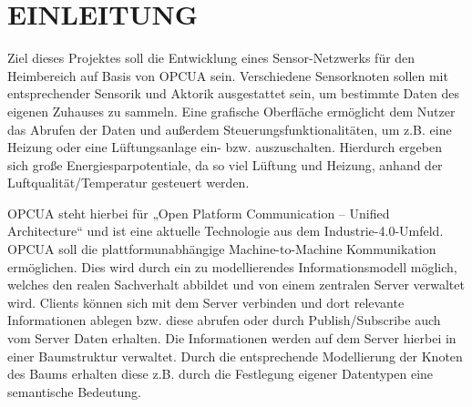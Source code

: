 \section{EINLEITUNG}\label{ch:einleitung}

Ziel dieses Projektes soll die Entwicklung eines Sensor-Netzwerks für den Heimbereich auf Basis von OPCUA sein. 
Verschiedene Sensorknoten sollen mit entsprechender Sensorik und Aktorik ausgestattet sein, um bestimmte Daten des eigenen Zuhauses zu sammeln. 
Eine grafische Oberfläche ermöglicht dem Nutzer das Abrufen der Daten und außerdem Steuerungsfunktionalitäten, um z.B. eine Heizung oder eine Lüftungsanlage ein- bzw. auszuschalten. 
Hierdurch ergeben sich große Energiesparpotentiale, da so viel Lüftung und Heizung, anhand der  Luftqualität/Temperatur gesteuert werden.  

OPCUA steht hierbei für „Open Platform Communication – Unified Architecture“ und ist eine aktuelle Technologie aus dem Industrie-4.0-Umfeld. OPCUA soll die plattformunabhängige Machine-to-Machine Kommunikation ermöglichen. 
Dies wird durch ein zu modellierendes Informationsmodell möglich, welches den realen Sachverhalt abbildet und von einem zentralen Server verwaltet wird. 
Clients können sich mit dem Server verbinden und dort relevante Informationen ablegen bzw. diese abrufen oder durch Publish/Subscribe auch vom Server Daten erhalten. Die Informationen werden auf dem Server hierbei in einer Baumstruktur verwaltet. 
Durch die entsprechende Modellierung der Knoten des Baums erhalten diese z.B. durch die Festlegung eigener Datentypen eine semantische Bedeutung.
